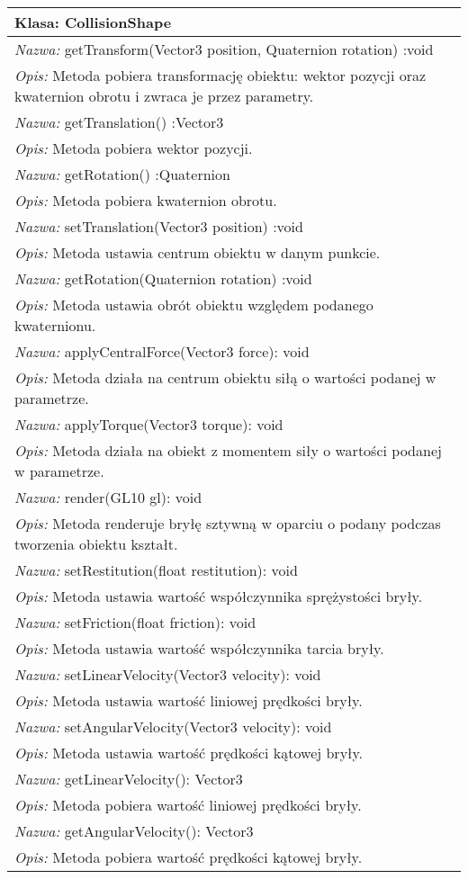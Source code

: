 \begin{tabular}{|p{\textwidth}|}
\hline
\textbf{Klasa: CollisionShape}\\ \hline
\emph{Nazwa: } getTransform(Vector3 position, Quaternion rotation) :void\\
\emph{Opis: } Metoda pobiera transformację obiektu: wektor pozycji oraz
kwaternion obrotu i zwraca je przez parametry.\\
\hline
\emph{Nazwa: } getTranslation() :Vector3\\
\emph{Opis: } Metoda pobiera wektor pozycji.\\
\hline
\emph{Nazwa: } getRotation() :Quaternion\\
\emph{Opis: } Metoda pobiera kwaternion obrotu.\\
\hline
\emph{Nazwa: } setTranslation(Vector3 position) :void\\
\emph{Opis: } Metoda ustawia centrum obiektu w danym punkcie.\\
\hline
\emph{Nazwa: } getRotation(Quaternion rotation) :void\\
\emph{Opis: } Metoda ustawia obrót obiektu względem podanego kwaternionu.\\
\hline
\emph{Nazwa: } applyCentralForce(Vector3 force): void\\
\emph{Opis: } Metoda działa na centrum obiektu siłą o wartości podanej w
parametrze.\\
\hline
\emph{Nazwa: } applyTorque(Vector3 torque): void\\
\emph{Opis: } Metoda działa na obiekt z momentem siły o wartości podanej w
parametrze.\\
\hline
\emph{Nazwa: } render(GL10 gl): void\\
\emph{Opis: } Metoda renderuje bryłę sztywną w oparciu o podany podczas
tworzenia obiektu kształt.\\
\hline
\emph{Nazwa: } setRestitution(float restitution): void\\
\emph{Opis: } Metoda ustawia wartość współczynnika sprężystości bryły.\\
\hline
\emph{Nazwa: } setFriction(float friction): void\\
\emph{Opis: } Metoda ustawia wartość współczynnika tarcia bryły.\\
\hline
\emph{Nazwa: } setLinearVelocity(Vector3 velocity): void\\
\emph{Opis: } Metoda ustawia wartość liniowej prędkości bryły.\\
\hline
\emph{Nazwa: } setAngularVelocity(Vector3 velocity): void\\
\emph{Opis: } Metoda ustawia wartość prędkości kątowej bryły.\\
\hline
\emph{Nazwa: } getLinearVelocity(): Vector3\\
\emph{Opis: } Metoda pobiera wartość liniowej prędkości bryły.\\
\hline
\emph{Nazwa: } getAngularVelocity(): Vector3\\
\emph{Opis: } Metoda pobiera wartość prędkości kątowej bryły.\\
\hline
\end{tabular}
